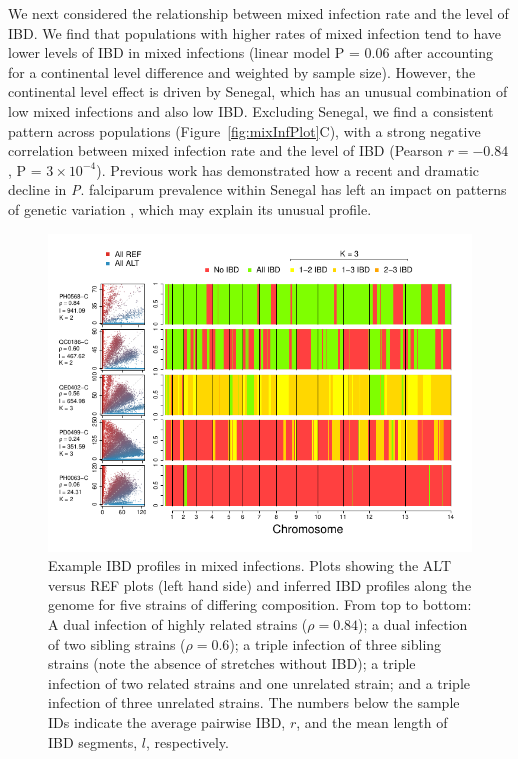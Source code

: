 \documentclass[9pt,lineno]{elife}
\begin{document}
We next considered the relationship between mixed infection rate and the level of IBD.  We find that populations with higher rates of mixed infection tend to have lower levels of IBD in mixed infections (linear model P = 0.06 after accounting for a continental level difference and weighted by sample size).  However, the continental level effect is driven by Senegal, which has an unusual combination of low mixed infections and also low IBD.  Excluding Senegal, we find a consistent pattern across populations (Figure~\ref{fig:mixInfPlot}C), with a strong negative correlation between mixed infection rate and the level of IBD (Pearson $r = -0.84$, P = $3\times10^{-4}$).  Previous work has demonstrated how a recent and dramatic decline in {\emph P. falciparum} prevalence within Senegal has left an impact on patterns of genetic variation \citep{Daniels2015}, which may explain its unusual profile.

\begin{figure}[ht]
  \begin{center}
  \includegraphics[width=.9\textwidth]{Fig4.pdf}
    \caption{Example IBD profiles in mixed infections. Plots showing the ALT versus REF plots (left hand side) and inferred IBD profiles along the genome for five strains of differing composition.  From top to bottom: A dual infection of highly related strains ($\rho = 0.84$); a dual infection of two sibling strains ($\rho = 0.6$); a triple infection of three sibling strains (note the absence of stretches without IBD); a triple infection of two related strains and one unrelated strain; and a triple infection of three unrelated strains.  The numbers below the sample IDs indicate the average pairwise IBD, $r$, and the mean length of IBD segments, $l$, respectively.}\label{fig:strainIBD}
    \end{center}
\end{figure}
\end{document}
